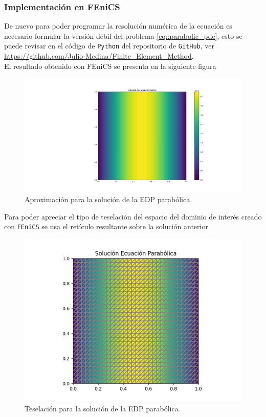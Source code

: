 \documentclass[a4paper]{article}
\begin{document}
\subsubsection{Implementación en FEniCS}
De nuevo para poder programar la resolución numérica de la ecuación es necesario formular la versión débil del problema \ref{eq::parabolic_pde}, esto se puede revisar en el código de \texttt{Python} del repositorio de \texttt{GitHub}, ver \url{https://github.com/Julio-Medina/Finite_Element_Method}.\\
El resultado obtenido con FEniCS se presenta en la siguiente figura
\begin{figure}[H]
\begin{center}
\includegraphics[scale=0.25]{./parabolic_FEniCS.png} 
\end{center} 
\caption{Aproximación para la solución de la EDP parabólica}
\label{fig::fig6}
\end{figure}
Para poder apreciar el tipo de teselación del espacio del dominio de interés creado con \texttt{FEniCS} se usa el retículo resultante sobre la solución anterior
\begin{figure}[H]
\begin{center}
\includegraphics[scale=0.39]{./parabolic_FEniCS_mesh.png} 
\end{center} 
\caption{Teselación para la solución de la EDP parabólica}
\label{fig::fig7}
\end{figure}
\end{document}
